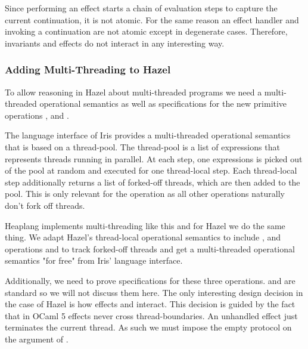 Since performing an effect starts a chain of evaluation steps to capture the current continuation, it is not atomic.
For the same reason an effect handler and invoking a continuation are not atomic except in degenerate cases.
Therefore, invariants and effects do not interact in any interesting way.

\subsubsection*{Adding Multi-Threading to Hazel}

To allow reasoning in Hazel about multi-threaded programs we need a multi-threaded operational semantics as well as specifications for the new primitive operations \efork{},  and .

The language interface of Iris provides a multi-threaded operational semantics that is based on a thread-pool.
The thread-pool is a list of expressions that represents threads running in parallel.
At each step, one expressions is picked out of the pool at random and executed for one thread-local step.
Each thread-local step additionally returns a list of forked-off threads, which are then added to the pool.
This is only relevant for the \efork{} operation as all other operations naturally don't fork off threads.


Heaplang implements multi-threading like this and for Hazel we do the same thing.
We adapt Hazel's thread-local operational semantics to include \efork{},  and  operations and to track forked-off threads and get a multi-threaded operational semantics "for free" from Iris' language interface.

Additionally, we need to prove specifications for these three operations.
 and  are standard so we will not discuss them here.
The only interesting design decision in the case of Hazel is how effects and \efork{} interact.
This decision is guided by the fact that in OCaml 5 effects never cross thread-boundaries.
An unhandled effect just terminates the current thread.
As such we must impose the empty protocol on the argument of \efork{}.


